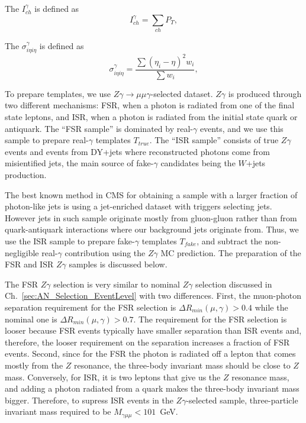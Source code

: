 The $I_{ch}^{\gamma}$ is defined as
\begin{equation}
  I_{ch}^{\gamma} = \sum_{ch} P_T,
\end{equation} 

The $\sigma_{i\eta i\eta}^{\gamma}$ is defined as
\begin{equation}
  \sigma_{i\eta i\eta}^{\gamma} = \frac{\sum{(\eta_i-\eta)^2 w_i}}{\sum{w_i}},
\end{equation}

To prepare templates, we use $Z\gamma\rightarrow\mu\mu\gamma$-selected dataset. $Z\gamma$ is produced through two different mechanisms: FSR, when a photon is radiated from one of the final state leptons, and ISR, when a photon is radiated from the initial state quark or antiquark. The ``FSR sample'' is dominated by real-$\gamma$ events, and we use this sample to prepare real-$\gamma$ templates $T_{true}$. The ``ISR sample'' consists of true $Z\gamma$ events and events from DY+jets where reconstructed photons come from misientified jets, the main source of fake-$\gamma$ candidates being the $W$+jets production. 

The best known method in CMS for obtaining a sample with a larger fraction of photon-like jets is using a jet-enriched dataset with triggers selecting jets. However jets in such sample originate mostly from gluon-gluon rather than from quark-antiquark interactions where our background jets originate from. Thus, we use the ISR sample to prepare fake-$\gamma$ templates $T_{fake}$, and subtract the non-negligible real-$\gamma$ contribution using the $Z\gamma$ MC prediction. The preparation of the FSR and ISR $Z\gamma$ samples is discussed below.

The FSR $Z\gamma$ selection is very similar to nominal $Z\gamma$ selection discussed in Ch.~\ref{sec:AN_Selection_EventLevel} with two differences. First, the muon-photon separation requirement for the FSR selection is $\Delta R_{min}(\mu,\gamma)>0.4$ while the nominal one is $\Delta R_{min}(\mu,\gamma)>0.7$. The requirement for the FSR selection is looser because FSR events typically have smaller separation than ISR events and, therefore, the looser requirement on the separation increases a fraction of FSR events. Second, since for the FSR the photon is radiated off a lepton that comes mostly from the $Z$ resonance, the three-body invariant mass should be close to $Z$ mass. Conversely, for ISR, it is two leptons that give us the $Z$ resonance mass, and adding a photon radiated from a quark makes the three-body invariant mass bigger. Therefore, to supress ISR events in the $Z\gamma$-selected sample, three-particle invariant mass required to be $M_{\gamma\mu\mu}<101$~GeV. 

